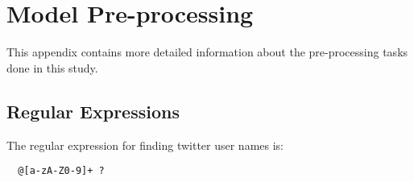 \chapter{Model Pre-processing}
\label{cha:appx-model-preprocessing}
This appendix contains more detailed information about the pre-processing tasks done in this study.


\section{Regular Expressions}
\label{sec:appx-regular-expressions}
The regular expression for finding twitter user names is:
\begin{verbatim}
  @[a-zA-Z0-9]+ ?
\end{verbatim}


